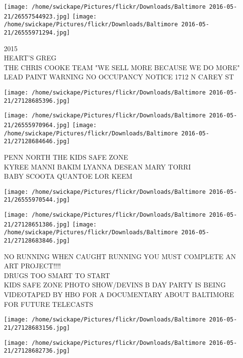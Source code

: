 \documentclass[10pt,letterpaper]{article}
\begin{document}
\texttt{[image: /home/swickape/Pictures/flickr/Downloads/Baltimore 2016-05-21/26557544923.jpg]}
\texttt{[image: /home/swickape/Pictures/flickr/Downloads/Baltimore 2016-05-21/26555971294.jpg]}

2015\\
HEART'S GREG\\
THE CHRIS COOKE TEAM "WE SELL MORE BECAUSE WE DO MORE"\\
LEAD PAINT WARNING NO OCCUPANCY NOTICE 1712 N CAREY ST\\
\pagebreak

\texttt{[image: /home/swickape/Pictures/flickr/Downloads/Baltimore 2016-05-21/27128685396.jpg]}

\vspace{0.25in}
\texttt{[image: /home/swickape/Pictures/flickr/Downloads/Baltimore 2016-05-21/26555970964.jpg]}
\texttt{[image: /home/swickape/Pictures/flickr/Downloads/Baltimore 2016-05-21/27128684646.jpg]}

PENN NORTH THE KIDS SAFE ZONE\\
KYREE MANNI BAKIM LYANNA DESEAN MARY TORRI\\
BABY SCOOTA QUANTOE LOR KEEM\\
\pagebreak

\texttt{[image: /home/swickape/Pictures/flickr/Downloads/Baltimore 2016-05-21/26555970544.jpg]}

\vspace{0.25in}
\texttt{[image: /home/swickape/Pictures/flickr/Downloads/Baltimore 2016-05-21/27128651386.jpg]}
\texttt{[image: /home/swickape/Pictures/flickr/Downloads/Baltimore 2016-05-21/27128683846.jpg]}

NO RUNNING WHEN CAUGHT RUNNING YOU MUST COMPLETE AN ART PROJECT!!!!\\
DRUGS TOO SMART TO START\\
KIDS SAFE ZONE PHOTO SHOW/DEVINS B DAY PARTY IS BEING VIDEOTAPED BY HBO FOR A DOCUMENTARY ABOUT BALTIMORE FOR FUTURE TELECASTS\\
\pagebreak

\texttt{[image: /home/swickape/Pictures/flickr/Downloads/Baltimore 2016-05-21/27128683156.jpg]}

\vspace{0.25in}
\texttt{[image: /home/swickape/Pictures/flickr/Downloads/Baltimore 2016-05-21/27128682736.jpg]}
\end{document}
